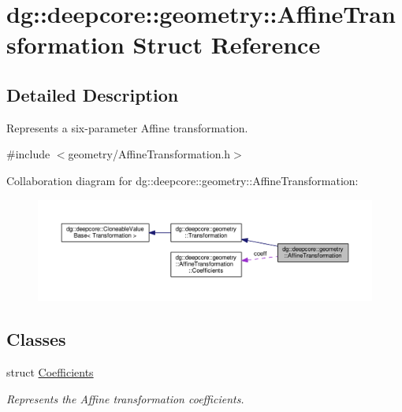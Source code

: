 \hypertarget{structdg_1_1deepcore_1_1geometry_1_1_affine_transformation}{}\section{dg\+:\+:deepcore\+:\+:geometry\+:\+:Affine\+Transformation Struct Reference}
\label{structdg_1_1deepcore_1_1geometry_1_1_affine_transformation}


\subsection{Detailed Description}
Represents a six-\/parameter Affine transformation. 

{\ttfamily \#include $<$geometry/\+Affine\+Transformation.\+h$>$}



Collaboration diagram for dg\+:\+:deepcore\+:\+:geometry\+:\+:Affine\+Transformation\+:
\nopagebreak
\begin{figure}[H]
\begin{center}
\leavevmode
\includegraphics[width=350pt]{structdg_1_1deepcore_1_1geometry_1_1_affine_transformation__coll__graph}
\end{center}
\end{figure}
\subsection*{Classes}
\begin{DoxyCompactItemize}
\item 
struct \hyperlink{structdg_1_1deepcore_1_1geometry_1_1_affine_transformation_1_1_coefficients}{Coefficients}
\begin{DoxyCompactList}\small\item\em Represents the Affine transformation coefficients. \end{DoxyCompactList}\end{DoxyCompactItemize}
